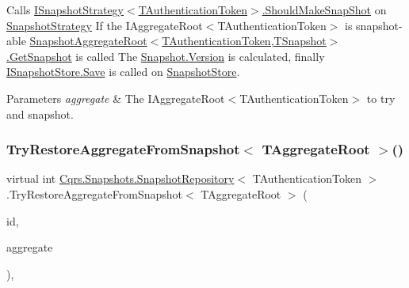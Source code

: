 Calls \hyperlink{interfaceCqrs_1_1Snapshots_1_1ISnapshotStrategy_ab1d54cd76c7ac832329cb3a6de0effcd_ab1d54cd76c7ac832329cb3a6de0effcd}{I\+Snapshot\+Strategy$<$\+T\+Authentication\+Token$>$.\+Should\+Make\+Snap\+Shot} on \hyperlink{classCqrs_1_1Snapshots_1_1SnapshotRepository_a7d65b4df10d0b6f75c911a9b6d59b3ba_a7d65b4df10d0b6f75c911a9b6d59b3ba}{Snapshot\+Strategy} If the I\+Aggregate\+Root$<$\+T\+Authentication\+Token$>$ is snapshot-\/able \hyperlink{classCqrs_1_1Snapshots_1_1SnapshotAggregateRoot_a30ec8fe3a09fec8238c5921c629a5ac1_a30ec8fe3a09fec8238c5921c629a5ac1}{Snapshot\+Aggregate\+Root$<$\+T\+Authentication\+Token,\+T\+Snapshot$>$.\+Get\+Snapshot} is called The \hyperlink{classCqrs_1_1Snapshots_1_1Snapshot_a59c0a399430e5f4a1b27d999c3bb5d4f_a59c0a399430e5f4a1b27d999c3bb5d4f}{Snapshot.\+Version} is calculated, finally \hyperlink{interfaceCqrs_1_1Snapshots_1_1ISnapshotStore_a6e99c620115ce8a0648a83bf2ce05527_a6e99c620115ce8a0648a83bf2ce05527}{I\+Snapshot\+Store.\+Save} is called on \hyperlink{classCqrs_1_1Snapshots_1_1SnapshotRepository_aba01e9f20eb41e6f3e4476a7f3182275_aba01e9f20eb41e6f3e4476a7f3182275}{Snapshot\+Store}. 


\begin{DoxyParams}{Parameters}
{\em aggregate} & The I\+Aggregate\+Root$<$\+T\+Authentication\+Token$>$ to try and snapshot.\\
\hline
\end{DoxyParams}
\mbox{\label{classCqrs_1_1Snapshots_1_1SnapshotRepository_a1328c103474b2b394b7af61a24455a65_a1328c103474b2b394b7af61a24455a65}} 
\subsubsection{\texorpdfstring{Try\+Restore\+Aggregate\+From\+Snapshot$<$ T\+Aggregate\+Root $>$()}{TryRestoreAggregateFromSnapshot< TAggregateRoot >()}}
{\footnotesize\ttfamily virtual int \hyperlink{classCqrs_1_1Snapshots_1_1SnapshotRepository}{Cqrs.\+Snapshots.\+Snapshot\+Repository}$<$ T\+Authentication\+Token $>$.Try\+Restore\+Aggregate\+From\+Snapshot$<$ T\+Aggregate\+Root $>$ (\begin{DoxyParamCaption}\item[{Guid}]{id,  }\item[{T\+Aggregate\+Root}]{aggregate }\end{DoxyParamCaption})\hspace{0.3cm}{\ttfamily [protected]}, {\ttfamily [virtual]}}



